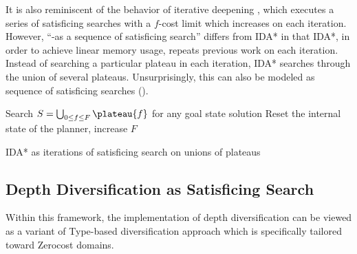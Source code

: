 % 
% 

It is also reminiscent of the behavior of iterative deepening \astar \cite{korf1985depth}, which executes a series of satisficing searches with a $f$-cost limit which increases on each iteration. However, ``\astar-as a sequence of satisficing search'' differs from IDA* in that IDA*, in order to achieve linear memory usage, repeats previous work on each iteration. Instead of searching a particular plateau in each iteration, IDA* searches through the union of several plateaus. Unsurprisingly, this can also be modeled as sequence of satisficing searches ().

\begin{algorithm}
 \begin{algorithmic}
  \LOOP
  \STATE Search $S=\bigcup_{0\leq f \leq F} \plateau{f}$ for any goal state
  \RETURN solution
  \ELSE
  \STATE Reset the internal state of the planner, increase $F$
  \ENDIF
  \ENDLOOP
 \end{algorithmic}
 \caption{IDA* as iterations of satisficing search on unions of plateaus}
 \label{alg:idastar-sat}
\end{algorithm}





\subsection{Depth Diversification as Satisficing Search}
\label{sec:depth-vs-types}
Within this framework, the implementation of depth diversification can be viewed as a variant of Type-based diversification approach \cite{xie14type} which is specifically tailored toward Zerocost domains.

